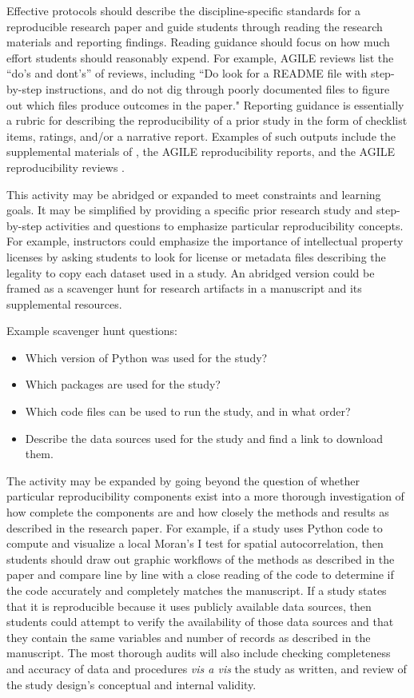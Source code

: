 \documentclass[
  12pt]{article}
\begin{document}
Effective protocols should describe the discipline-specific standards for a reproducible research paper and guide students through reading the research materials and reporting findings.
Reading guidance should focus on how much effort students should reasonably expend.
For example, AGILE reviews \citep{nustAGILEguidelines} list the ``do's and dont's'' of reviews, including ``Do look for a README file with step-by-step instructions, and do not dig through poorly documented files to figure out which files produce outcomes in the paper."
Reporting guidance is essentially a rubric for describing the reproducibility of a prior study in the form of checklist items, ratings, and/or a narrative report. 
Examples of such outputs include the supplemental materials of \citet{vilh:2022}, the AGILE reproducibility reports, and the AGILE reproducibility reviews \citep{AGILE2024}.

This activity may be abridged or expanded to meet constraints and learning goals.
It may be simplified by providing a specific prior research study and step-by-step activities and questions to emphasize particular reproducibility concepts.
For example, instructors could emphasize the importance of intellectual property licenses by asking students to look for license or metadata files describing the legality to copy each dataset used in a study. 
An abridged version could be framed as a scavenger hunt for research artifacts in a manuscript and its supplemental resources.

Example scavenger hunt questions:
\begin{itemize}
\item Which version of Python was used for the study?
\item Which packages are used for the study?
\item Which code files can be used to run the study, and in what order?
\item Describe the data sources used for the study and find a link to download them.
\end{itemize}

The activity may be expanded by going beyond the question of whether particular reproducibility components exist into a more thorough investigation of how complete the components are and how closely the methods and results as described in the research paper. 
For example, if a study uses Python code to compute and visualize a local Moran's I test for spatial autocorrelation, then students should draw out graphic workflows of the methods as described in the paper and compare line by line with a close reading of the code to determine if the code accurately and completely matches the manuscript. 
If a study states that it is reproducible because it uses publicly available data sources, then students could attempt to verify the availability of those data sources and that they contain the same variables and number of records as described in the manuscript.
The most thorough audits will also include checking completeness and accuracy of data and procedures \textit{vis a vis} the study as written, and review of the study design's conceptual and internal validity.
\end{document}
